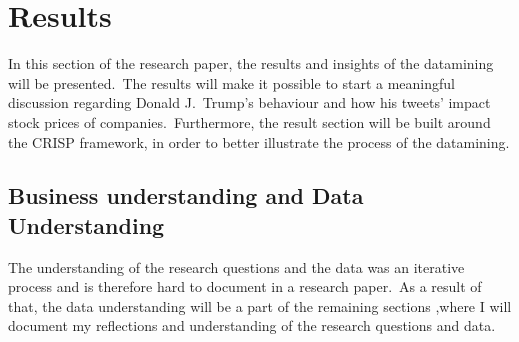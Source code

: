 \documentclass[12pt]{article}
\begin{document}



\section{Results}
In this section of the research paper, the results and insights of the datamining will be presented.\ The results will make it possible to start a meaningful discussion regarding Donald J.\ Trump's behaviour and how his tweets' impact stock prices of companies.\ Furthermore, the result section will be built around the CRISP framework, in order to better illustrate the process of the datamining.

\subsection{Business understanding and Data Understanding}
The understanding of the research questions and the data was an iterative process and is therefore hard to document in a research paper.\ As a result of that, the data understanding will be a part of the remaining sections ,where I will document my reflections and understanding of the research questions and data.  \\
\end{document}

